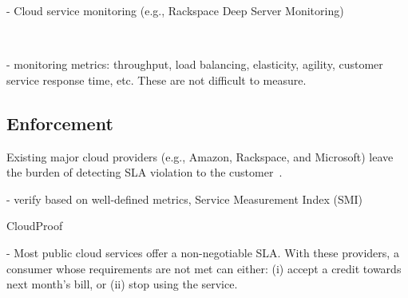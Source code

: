 - Cloud service monitoring (e.g., Rackspace Deep Server Monitoring)

~\cite{ABD+13,FEH+14}

- monitoring metrics: throughput, load balancing, elasticity, agility, customer service response time, etc. These are not difficult to measure.


\subsection{Enforcement} \label{sect:sla-enforcement}

Existing major cloud providers (e.g., Amazon, Rackspace, and Microsoft) leave the burden of detecting SLA violation to the customer~\cite{Bas12}.

- verify based on well-defined metrics, Service Measurement Index (SMI)

CloudProof~\cite{PLM+11}


- Most public cloud services offer a non-negotiable SLA. With these providers, a consumer whose requirements are not met can either: (i) accept a credit towards next month's bill, or (ii) stop using the service.